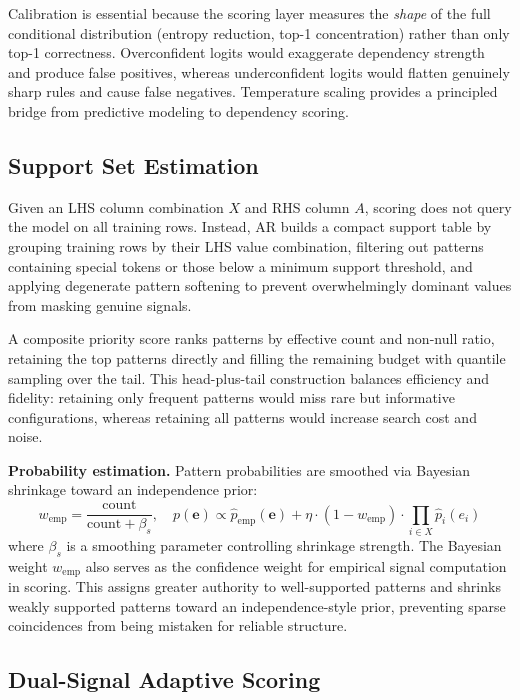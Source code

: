 \documentclass[conference]{IEEEtran}
\begin{document}
Calibration is essential because the scoring layer measures the \emph{shape} of the full conditional distribution (entropy reduction, top-1 concentration) rather than only top-1 correctness. Overconfident logits would exaggerate dependency strength and produce false positives, whereas underconfident logits would flatten genuinely sharp rules and cause false negatives. Temperature scaling provides a principled bridge from predictive modeling to dependency scoring.

\subsection{Support Set Estimation}\label{sec:support}

Given an LHS column combination $X$ and RHS column $A$, scoring does not query the model on all training rows. Instead, AR builds a compact support table by grouping training rows by their LHS value combination, filtering out patterns containing special tokens or those below a minimum support threshold, and applying degenerate pattern softening to prevent overwhelmingly dominant values from masking genuine signals.

A composite priority score ranks patterns by effective count and non-null ratio, retaining the top patterns directly and filling the remaining budget with quantile sampling over the tail. This head-plus-tail construction balances efficiency and fidelity: retaining only frequent patterns would miss rare but informative configurations, whereas retaining all patterns would increase search cost and noise.

\textbf{Probability estimation.} Pattern probabilities are smoothed via Bayesian shrinkage toward an independence prior:
\begin{equation}
    w_{\text{emp}} = \frac{\text{count}}{\text{count} + \beta_s}, \quad
    p(\mathbf{e}) \propto \hat{p}_{\text{emp}}(\mathbf{e}) + \eta \cdot (1 - w_{\text{emp}}) \cdot \prod_{i \in X} \hat{p}_i(e_i)
\end{equation}
where $\beta_s$ is a smoothing parameter controlling shrinkage strength. The Bayesian weight $w_{\text{emp}}$ also serves as the confidence weight for empirical signal computation in scoring. This assigns greater authority to well-supported patterns and shrinks weakly supported patterns toward an independence-style prior, preventing sparse coincidences from being mistaken for reliable structure.

\subsection{Dual-Signal Adaptive Scoring}\label{sec:scoring}
\end{document}
